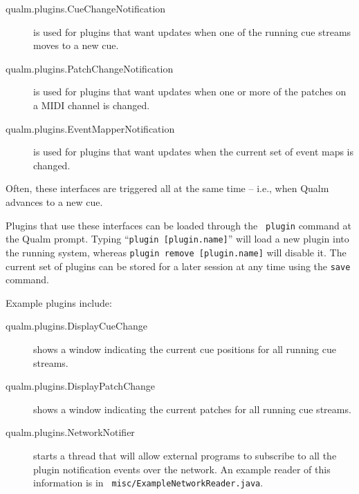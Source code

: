 \documentclass{article}
\newcommand{\q}{{\textsf{Qualm}}\xspace}
\begin{document}
\begin{description}
\item[qualm.plugins.CueChangeNotification] is used for plugins that
  want updates when one of the running cue streams moves to a new cue.

\item[qualm.plugins.PatchChangeNotification] is used for plugins that
  want updates when one or more of the patches on a MIDI channel is
  changed.

\item[qualm.plugins.EventMapperNotification] is used for plugins that
  want updates when the current set of event maps is changed.
\end{description}

Often, these interfaces are triggered all at the same time -- i.e.,
when \q advances to a new cue.

Plugins that use these interfaces can be loaded through the {\tt
  plugin} command at the \q prompt.  Typing ``{\tt plugin
  [plugin.name]}'' will load a new plugin into the running system,
whereas {\tt plugin remove [plugin.name]} will disable it.  The
current set of plugins can be stored for a later session at any time
using the {\tt save} command.

Example plugins include:

\begin{description}
\item[qualm.plugins.DisplayCueChange] shows a window indicating the
  current cue positions for all running cue streams.
\item[qualm.plugins.DisplayPatchChange] shows a window indicating the
  current patches for all running cue streams.
\item[qualm.plugins.NetworkNotifier] starts a thread that will allow
  external programs to subscribe to all the plugin notification events
  over the network.  An example reader of this information is in {\tt
    misc/ExampleNetworkReader.java}.
\end{description}

\newpage
\printindex
\end{document}
